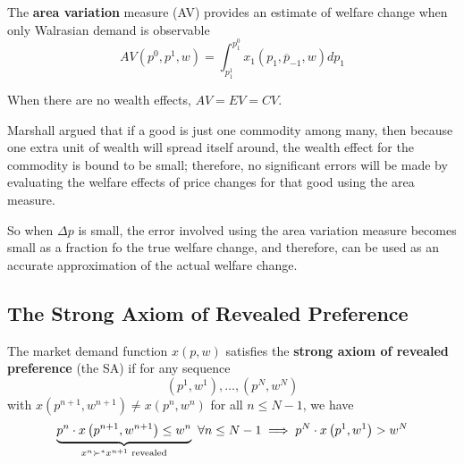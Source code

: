 \documentclass{report}
\begin{document}
 			\begin{definition}
 				The \textbf{area variation} measure (AV) provides an estimate of welfare change when only Walrasian demand is observable
 				\begin{equation}
 					A V\left(p^{0}, p^{1}, w\right)=\int_{p_{1}^{1}}^{p_{1}^{0}} x_{1}\left(p_{1}, \overline{p}_{-1}, w\right) d p_{1}
 				\end{equation}
 			\end{definition}
 			
 			\begin{remark}
 				When there are no wealth effects, $AV=EV=CV$.
 			\end{remark}
 			
 			\begin{remark}
 				Marshall argued that if a good is just one commodity among many, then because one extra unit of wealth will spread itself around, the wealth effect for the commodity is bound to be small; therefore, no significant errors will be made by evaluating the welfare effects of price changes for that good using the area measure.
 			\end{remark}
 			
 			\begin{remark}
 				So when $\Delta p$ is small, the error involved using the area variation measure becomes small as a fraction fo the true welfare change, and therefore, can be used as an accurate approximation of the actual welfare change.
 			\end{remark}
 			
 		\subsection{The Strong Axiom of Revealed Preference}
 			\begin{definition}[3.J.1]
 				The market demand function $x(p, w)$ satisfies the \textbf{strong axiom of revealed preference} (the SA) if for any sequence
 				\begin{equation}
 					\left(p^{1}, w^{1}\right), \ldots,\left(p^{N}, w^{N}\right)
 				\end{equation}
 				with $x\left(p^{n+1}, w^{n+1}\right) \neq x\left(p^{n}, w^{n}\right)$ for all $n \leq N-1$, we have 
 				\begin{equation}
 					\underbrace{p^{n} \cdot x\left(p^{n+1}, w^{n+1}\right) \leq w^{n}}_{x^n \succ^* x^{n+1} \text{{ revealed}}}
 					\ \forall n \leq N - 1
 					\implies p^{N} \cdot x\left(p^1, w^1\right)>w^{N}
 				\end{equation}
 			\end{definition}
 			
\end{document}
